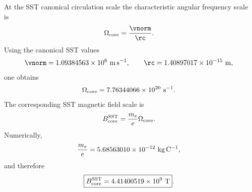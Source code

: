     At the SST canonical circulation scale the characteristic angular frequency scale is
    \begin{equation}
        \Omega_{\rm core}
        =
        \frac{\vnorm}{\rc}.
        \label{eq:omega_core}
    \end{equation}
    Using the canonical SST values
    \begin{equation}
        \vnorm
        =
        1.09384563\times10^{6}\ {\rm m\,s^{-1}},
        \qquad
        \rc
        =
        1.40897017\times10^{-15}\ {\rm m},
    \end{equation}
    one obtains
    \begin{equation}
        \Omega_{\rm core}
        =
        7.76344066\times10^{20}\ {\rm s^{-1}}.
        \label{eq:omega_core_numeric}
    \end{equation}
    The corresponding SST magnetic field scale is
    \begin{equation}
        B_{\rm core}^{\rm SST}
        =
        \frac{m_e}{e}\Omega_{\rm core}.
        \label{eq:Bcore_sst}
    \end{equation}
    Numerically,
    \begin{equation}
        \frac{m_e}{e}
        =
        5.68563010\times10^{-12}\ {\rm kg\,C^{-1}},
    \end{equation}
    and therefore
    \begin{equation}
        \boxed{
            B_{\rm core}^{\rm SST}
            =
            4.41400519\times10^{9}\ {\rm T}
        } .
        \label{eq:Bcore_numeric}
    \end{equation}
    
